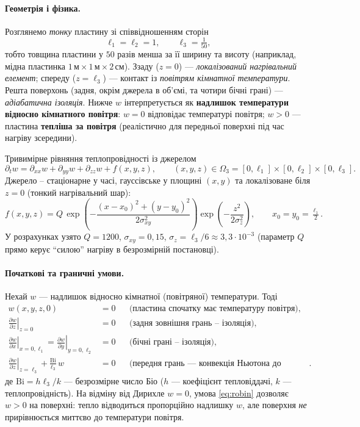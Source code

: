 \documentclass[12pt,a4paper]{article}
\newcommand{\Om}{\Omega}
\newcommand{\dt}{\partial_t}
\newcommand{\dxx}{\partial_{xx}}
\newcommand{\dyy}{\partial_{yy}}
\begin{document}
\paragraph{Геометрія і фізика.} Розглянемо \emph{тонку} пластину зі співвідношенням сторін
\begin{equation}
  \ell_1 = \ell_2 = 1, \qquad \ell_3 = \tfrac{1}{50},
\end{equation}
тобто товщина пластини у $50$ разів менша за її ширину та висоту (наприклад, мідна пластинка $1\,\text{м}\times 1\,\text{м}\times 2\,\text{см}$). Ззаду ($z=0$) --- \emph{локалізований нагрівальний елемент}; спереду ($z=\ell_3$) --- контакт із \emph{повітрям кімнатної температури}. Решта поверхонь (задня, окрім джерела в об'ємі, та чотири бічні грані) --- \emph{адіабатична ізоляція}. Нижче $w$ інтерпретується як \textbf{надлишок температури відносно кімнатного повітря}: $w=0$ відповідає температурі повітря; $w>0$ --- пластина \textbf{тепліша за повітря} (реалістично для передньої поверхні під час нагріву зсередини).

Тривимірне рівняння теплопровідності із джерелом
\begin{equation}
  \dt w = \dxx w + \dyy w + \partial_{zz} w + f(x,y,z),
  \qquad (x,y,z)\in \Om_3 = [0,\ell_1]\times[0,\ell_2]\times[0,\ell_3]. \label{eq:3d}
\end{equation}
Джерело -- стаціонарне у часі, гауссівське у площині $(x,y)$ та локалізоване біля $z=0$ (тонкий нагрівальний шар):
\begin{equation}
  f(x,y,z) = Q \, \exp\!\left(
    -\frac{(x-x_0)^2 + (y-y_0)^2}{2\sigma_{xy}^2}\right)
    \exp\!\left( -\frac{z^2}{2\sigma_z^2}\right),
  \qquad x_0 = y_0 = \tfrac{\ell_1}{2}. \label{eq:3dsrc}
\end{equation}
У розрахунках узято $Q=1200$, $\sigma_{xy}=0{,}15$, $\sigma_z = \ell_3/6 \approx 3{,}3\cdot 10^{-3}$ (параметр $Q$ прямо керує ``силою'' нагріву в безрозмірній постановці).

\paragraph{Початкові та граничні умови.}
Нехай $w$ --- надлишок відносно кімнатної (повітряної) температури. Тоді
\begin{align}
  w(x,y,z,0) &= 0 && \text{(пластина спочатку має температуру повітря)}, \\
  \left.\frac{\partial w}{\partial z}\right|_{z=0} &= 0 && \text{(задня зовнішня грань -- ізоляція)}, \\
  \left.\frac{\partial w}{\partial x}\right|_{x=0,\ell_1}
  = \left.\frac{\partial w}{\partial y}\right|_{y=0,\ell_2} &= 0 && \text{(бічні грані -- ізоляція)}, \\
  \left.\frac{\partial w}{\partial z}\right|_{z=\ell_3}
    + \frac{\mathrm{Bi}}{\ell_3}\, w &= 0 && \text{(передня грань --- конвекція Ньютона до повітря)}. \label{eq:robin}
\end{align}
де $\mathrm{Bi} = h\ell_3/k$ --- безрозмірне число Біо ($h$ --- коефіцієнт тепловіддачі, $k$ --- теплопровідність). На відміну від Дирихле $w=0$, умова \eqref{eq:robin} дозволяє $w>0$ на поверхні: тепло відводиться пропорційно надлишку $w$, але поверхня \emph{не} прирівнюється миттєво до температури повітря.
\end{document}
